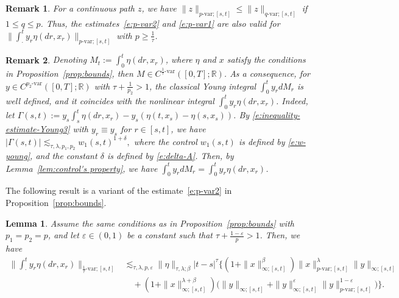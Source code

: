 \documentclass[11pt,reqno]{amsart}
\newtheorem{lemma}{Lemma}[section]
\newtheorem{remark}{Remark}[section]
\numberwithin{equation}{section}
\begin{document}
\begin{remark}
For a continuous path $z$, we have $\|z\|_{p\text{-}\mathrm{var};[s,t]}\le\|z\|_{q\text{-}\mathrm{var};[s,t]}$ if $1\le q\le p$. Thus, the estimates~\eqref{e:p-var2} and \eqref{e:p-var1} are also valid for $\|\int_{\cdot}^{t}y_{r}\eta(dr,x_{r})\|_{p\text{-}\mathrm{var};[s,t]}$ with $p\ge \frac1\tau$.  
\end{remark}


\begin{remark}\label{rem:M_t}
Denoting $M_{t}:= \int_{0}^{t} \eta(dr,x_r)$, where $\eta$ and $x$ satisfy the conditions  in Proposition~\ref{prop:bounds}, then $M\in C^{\frac{1}{\tau}\text{-}\mathrm{var}}([0,T];\mathbb{R})$. As a consequence, for $y\in C^{p_{2}\text{-}\mathrm{var}}([0,T];\mathbb{R})$ with $\tau + \frac{1}{p_{2}}>1$, the classical Young integral $\int_{0}^{t} y_r dM_r$ is well defined, and it coincides with the nonlinear integral $\int_{0}^{t} y_r \eta(dr,x_r)$. Indeed, let $\Gamma(s,t):= y_{s} \int_{s}^{t} \eta(dr,x_r) - y_s \left(\eta(t,x_s)-\eta(s,x_s)\right)$. By \eqref{e:inequality-estimate-Young3} with $y_{r}\equiv y_{s}$ for $r\in[s,t]$, we have $\left|\Gamma(s,t)\right| \lesssim_{\tau,\lambda,p_{1},p_{2}} w_{1}(s,t)^{1+\delta},$ where the control $w_1(s,t)$ is defined by \eqref{e:w-young}, and the constant $\delta$ is defined by \eqref{e:delta-A}. Then, by Lemma~\ref{lem:control's property}, we have  $\int_{0}^{t}y_r dM_r = \int_{0}^{t}y_r \eta(dr,x_r)$.
\end{remark}


The following result is a variant of the estimate~\eqref{e:p-var2} in Proposition~\ref{prop:bounds}.
\begin{lemma}\label{lem:estimate for Young integral-for g is bounded}
Assume the same conditions as in Proposition~\ref{prop:bounds} with $p_{1} = p_{2} = p$, and let $\varepsilon\in(0,1)$ be a constant such that $\tau + \frac{1-\varepsilon}{p}>1$. Then, we have
\begin{equation}\label{e:p-var3}
\begin{aligned}
\Big\|\int_{\cdot}^{t}y_{r}\eta(dr,x_{r})\Big\|_{\frac{1}{\tau}\text{-}\mathrm{var};[s,t]}&\lesssim_{\tau,\lambda,p,\varepsilon} \|\eta\|_{\tau,\lambda;\beta} |t-s|^{\tau} \Big\{ (1 + \|x\|^{\beta}_{\infty;[s,t]})\|x\|^{\lambda}_{p\text{-}\mathrm{var};[s,t]}\|y\|_{\infty;[s,t]}\\
& \quad +\left(1 + \|x\|^{\lambda + \beta}_{\infty;[s,t]}\right)\Big(\|y\|_{\infty;[s,t]} + \|y\|^{\varepsilon}_{\infty;[s,t]}\|y\|^{1-\varepsilon}_{p\text{-}\mathrm{var};[s,t]}\Big) \Big\}.
\end{aligned}
\end{equation}
\end{lemma}
\end{document}
